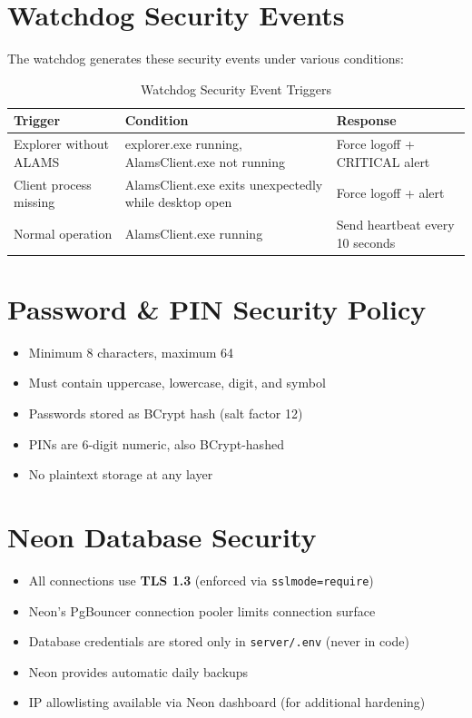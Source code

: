 \section{Watchdog Security Events}

The watchdog generates these security events under various conditions:

\begin{table}[h!]
\centering
\caption{Watchdog Security Event Triggers}
\label{tab:watchdog-events}
\begin{tabularx}{\textwidth}{lXl}
\toprule
\textbf{Trigger} & \textbf{Condition} & \textbf{Response}\\
\midrule
\rowcolor{aurxonlightgray}
Explorer without ALAMS & explorer.exe running, AlamsClient.exe not running & Force logoff + CRITICAL alert\\
Client process missing & AlamsClient.exe exits unexpectedly while desktop open & Force logoff + alert\\
\rowcolor{aurxonlightgray}
Normal operation & AlamsClient.exe running & Send heartbeat every 10 seconds\\
\bottomrule
\end{tabularx}
\end{table}

\section{Password \& PIN Security Policy}

\begin{tcolorbox}[alamsbox, title={\faShieldAlt\quad Recommended Password Policy}]
\begin{itemize}[label={\faCheckCircle}]
  \item Minimum 8 characters, maximum 64
  \item Must contain uppercase, lowercase, digit, and symbol
  \item Passwords stored as BCrypt hash (salt factor 12)
  \item PINs are 6-digit numeric, also BCrypt-hashed
  \item No plaintext storage at any layer
\end{itemize}
\end{tcolorbox}

\section{Neon Database Security}

\begin{itemize}[label={\textcolor{aurxongreen}{\faLock}}]
  \item All connections use \textbf{TLS 1.3} (enforced via \texttt{sslmode=require})
  \item Neon's PgBouncer connection pooler limits connection surface
  \item Database credentials are stored only in \texttt{server/.env} (never in code)
  \item Neon provides automatic daily backups
  \item IP allowlisting available via Neon dashboard (for additional hardening)
\end{itemize}

